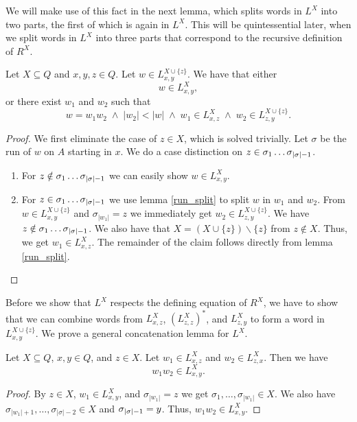 
We will make use of this fact in the next lemma, which splits words in $L^{X}$ into two parts,
the first of which is again in $L^{X}$. 
This will be quintessential later, when we split words in $L^{X}$ into three parts 
that correspond to the recursive definition of $R^X$.

\begin{lemma}
    \label{L_split}
    Let $X \subseteq Q$ and $x,y,z \in Q$.
    Let $w \in L^{X\cup\{z\}}_{x,y}$.
    We have that either    
    \begin{equation*}
        w \in L^{X}_{x,y}, 
    \end{equation*}
    or there exist $w_1$ and $w_2$ such that
    \begin{equation*}
        w = w_1 w_2 \; \wedge \; |w_2| < |w| \;
        \wedge \; w_1 \in L^X_{x,z} \; \wedge \; w_2 \in L^{X \cup \{z\}}_{z,y}.
    \end{equation*}
\end{lemma}
\begin{proof}
    We first eliminate the case of $z \in X$, which is solved trivially.
    Let $\sigma$ be the run of $w$ on $A$ starting in $x$.
    We do a case distinction on $z \in \sigma_1 \ldots {\sigma}_{|{\sigma}|-1}$.
    \begin{enumerate}
        \item For $z \notin \sigma_1 \ldots {\sigma}_{|{\sigma}|-1}$ we can easily show $w \in L^X_{x,y}$.
        \item 
            For $z \in \sigma_1 \ldots {\sigma}_{|{\sigma}|-1}$ we use lemma \ref{run_split} to split $w$ in $w_1$ and $w_2$.
            From $w \in L^{X\cup\{z\}}_{x,y}$ and $\sigma_{|w_1|} = z$ we immediately get $w_2 \in L^{X\cup\{z\}}_{z,y}$.
            We have $z \notin \sigma_1 \ldots {\sigma}_{|{\sigma}|-1}$.
            We also have that $X = (X \cup \{z\})\backslash\{z\}$ from $z \notin X$.
            Thus, we get $w_1 \in L^{X}_{x,z}$. The remainder of the claim follows directly from lemma \ref{run_split}.
    \end{enumerate}
\end{proof}

Before we show that $L^X$ respects the defining equation of $R^X$, 
we have to show that we can combine words from $L^{X}_{x,z}$, $(L^{X}_{z,z})^*$, and $L^{X}_{z,y}$ to form a word in $L^{X\cup\{z\}}_{x,y}$.
We prove a general concatenation lemma for $L^X$.

\begin{lemma}
    \label{L_cat}
    Let $X \subseteq Q$, $x,y\in Q$, and $z \in X$. 
    Let $w_1 \in L^X_{x,z}$ and $w_2 \in L^X_{z,x}$.
    Then we have
    \begin{equation*}
        w_1 w_2 \in L^X_{x,y}.
    \end{equation*}
\end{lemma}
\begin{proof}
    By $z \in X$, $w_1 \in L^X_{x,y}$, and $\sigma_{|w_1|} = z$ we get $\sigma_1, \ldots, \sigma_{|w_1|} \in X$.
    We also have $\sigma_{|w_1|+1}, \ldots, \sigma_{|\sigma|-2} \in X$ and ${\sigma}_{|{\sigma}|-1} = y$. Thus, $w_1 w_2 \in L^X_{x,y}$.
\end{proof}

